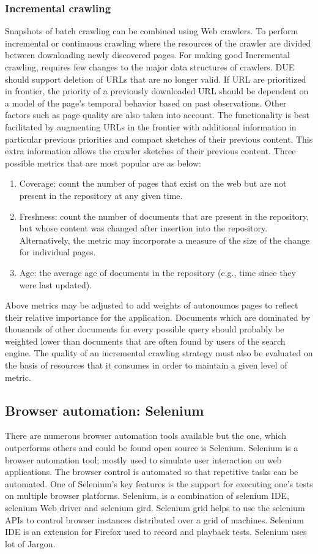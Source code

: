 \documentclass[article,type=msc,colorback,accentcolor=tud9c,twoside,11pt]{tudthesis}
\begin{document}
\subsubsection{Incremental crawling}
Snapshots of batch crawling can be combined using Web crawlers. To perform incremental or continuous crawling where the resources of the crawler are divided between downloading newly discovered pages. For making good Incremental crawling, requires few changes to the major data structures of crawlers. DUE should support deletion of URLs that are no longer valid. If URL are prioritized in frontier, the priority of a previously downloaded URL should be dependent on a model of the page's temporal behavior based on past observations. Other factors such as page quality are also taken into account. The functionality is best facilitated by augmenting URLs in the frontier with additional information in particular previous priorities and compact sketches of their previous content. This extra information allows the crawler sketches of their previous content. Three possible metrics that are most popular are as below:
\begin{enumerate}
	\item Coverage: count the number of pages that exist on the web but are not present in the repository at any given time.
	\item Freshness: count the number of documents that are present in the repository, but whose content was
	changed after insertion into the repository. Alternatively, the metric may incorporate a measure of the
	size of the change for individual pages.
	\item Age: the average age of documents in the repository (e.g., time since they were last updated).
\end{enumerate}
Above metrics may be adjusted to add weights of autonoumos pages to reflect their relative importance for the application. Documents which are dominated by thousands of other documents for every possible query should probably be weighted lower than documents that are often found by users of the search engine. The quality of an incremental crawling strategy must also be evaluated on the basis of resources that it consumes in order to maintain a given level of metric.




\subsection{Browser automation: Selenium}
There are numerous browser automation tools available but the one, which outperforms others and could be found open source is Selenium. Selenium\cite{AutomationTestingAnIntroductiontoSelenium} is a browser automation tool; mostly used to simulate user interaction on web applications. The browser control is automated so that repetitive tasks can be automated. One of Selenium's key features is the support for executing one's tests on multiple browser platforms. Selenium,  is a combination of selenium IDE, selenium Web driver and selenium gird. Selenium grid helps to use the selenium APIs to control browser instances distributed over a grid of machines. Selenium IDE is an extension for Firefox used to record and playback tests. Selenium uses lot of Jargon.
\end{document}
